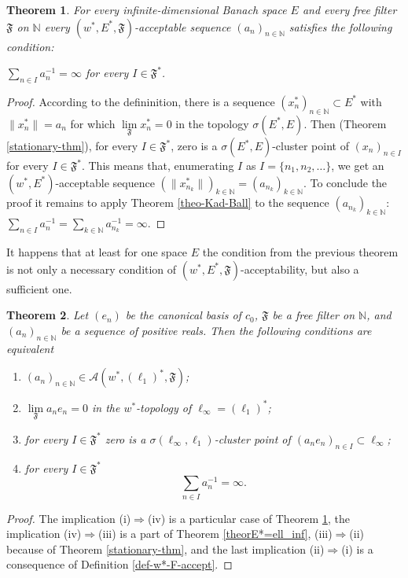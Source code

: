 \documentclass[11pt,twoside, reqno]{amsart}
\newcommand{\N}{{\mathbb N}}
\newcommand{\F}{\mathfrak{F}}
\newcommand{\flim}{\lim\limits_\F }
\theoremstyle{plain}
\newtheorem{theorem}{Theorem}[section]
\theoremstyle{remark}
\theoremstyle{definition}
\numberwithin{equation}{section}
\begin{document}
\begin{theorem} \label{thmA(gener)}
For every  infinite-dimensional Banach space $E$ and every free filter $\F$ on $\N$ every  $(w^*, E^*, \F)$-acceptable sequence $(a_n)_{n \in \N}$ satisfies the following condition:

\centerline{ $\sum\limits_{n \in I} a_n^{-1} = \infty$ for every $I \in \F^*$.}
\end{theorem}

\begin{proof}
According to the defininition,  there is a sequence $(x_n^*)_{n \in \N} \subset E^*$ with $\|x_n^*\|=a_n$ for which  $\flim x_n^*= 0$ in the  topology $\sigma(E^*, E)$. Then (Theorem \ref{stationary-thm}), for every $I \in \F^*$, zero is a $\sigma(E^*, E)$-cluster point of  $(x_n)_{n \in I}$ for every $I \in \F^*$. This means that, enumerating $I$ as $I=\{n_1, n_2, \dots\}$, we get an  $(w^*, E^*)$-acceptable sequence $( \|x_{n_k}^*\|)_{k \in \N}=(a_{n_k})_{k \in \N}$. To conclude the proof it remains to apply  Theorem \ref{theo-Kad-Ball} to the sequence $(a_{n_k})_{k \in \N}$:  $\sum\limits_{n \in I} a_n^{-1} = \sum\limits_{k \in \N} a_{n_k}^{-1} = \infty$.
\end{proof}

It happens that at least for one space $E$ the condition from the previous theorem is not only a necessary condition of  $(w^*, E^*, \F)$-acceptability, but also a sufficient one.

\begin{theorem}\label{thmA(ellinf)}
Let  $(e_n)$ be the canonical basis of $c_0$, $\F$ be a free filter on $\N$, and  $(a_n)_{n \in \N}$ be a sequence of positive reals. Then the following conditions are equivalent

\begin{enumerate}
\item[(i)]  $(a_n)_{n \in \N} \in \mathcal A(w^*, (\ell_1)^*, \F)$;

\item[(ii)] $\flim a_n e_n = 0$ in the $w^*$-topology of $\ell_\infty = (\ell_1)^*$;

\item[(iii)]  for every $I \in \F^*$ zero is a $\sigma(\ell_\infty, \ell_1)$-cluster point of  $(a_n e_n)_{n \in I} \subset \ell_\infty$;

\item[(iv)]  for every $I \in \F^*$
$$
\sum\limits_{n \in I} a_n^{-1} = \infty.
$$
\end{enumerate}
\end{theorem}
\begin{proof}
The implication (i)$\Longrightarrow$(iv) is a particular case of Theorem \ref{thmA(gener)}, the implication (iv)$\Longrightarrow$(iii) is a part of Theorem \ref{theorE*=ell_inf}, (iii)$\Longrightarrow$(ii) because of Theorem \ref{stationary-thm}, and the last implication (ii)$\Longrightarrow$(i) is a consequence of Definition \ref{def-w*-F-accept}. 
\end{proof}
\end{document}
